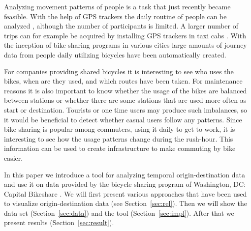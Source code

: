 Analyzing movement patterns of people is a task that just recently became
feasible. With the help of GPS trackers the daily routine of people can
be analyzed \cite{geo1, geo2, geo3}, although the number of participants
is limited. A larger number of trips can for example be acquired
by installing GPS trackers in taxi cabs \cite{Ferreira2013, Guo2012}.
With the inception of bike sharing programs in various cities large
amounts of journey data from people daily utilizing bicycles have
been automatically created.

For companies providing shared bicycles it is interesting to see who
uses the bikes, when are they used, and which routes have been taken.
For maintenance reasons it is also important to know whether the usage
of the bikes are balanced between stations or whether there are some
stations that are used more often as start or destination.
Tourists or one time users may produce such imbalances, so it
would be beneficial to detect whether casual users follow any patterns.
Since bike sharing is popular among commuters, using it daily to get
to work, it is interesting to see how the usage patterns change during
the rush-hour. This information can be used to create infrastructure
to make commuting by bike easier.

In this paper we introduce a tool for analyzing temporal
origin-destination data and use it on data provided by
the bicycle sharing program
of Washington, DC: Capital Bikeshare \cite{wash}.
We will first present various approaches that have been used
to visualize origin-destination data (see Section~\ref{sec:rel}).
Then we will show the data set (Section~\ref{sec:data}) and
the tool (Section~\ref{sec:impl}).
After that we present results (Section~\ref{sec:result}).
